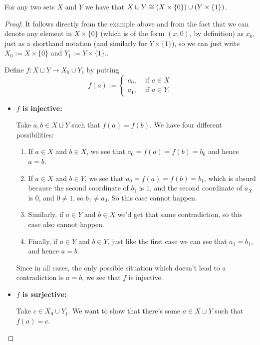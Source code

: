 \begin{lemma}\label{lem:sqcup is indexed union}
	For any two sets $X$ and $Y$ we have that $X\sqcup Y\cong (X\times\{0\})\cup (Y\times\{1\})$.
\end{lemma}
\begin{proof}
	It follows directly from the example above and from the fact that we can denote any element in $X\times\{0\}$ (which is of the form $(x,0)$, by definition) as $x_0$, just as a shorthand notation (and similarly for $Y\times\{1\}$), so we can just write $X_0:=X\times\{0\}$ and $Y_1:=Y\times\{1\}$..
	
	\bigskip
	Define $f:X\sqcup Y\to X_0\cup Y_1$ by putting
	\[f(a):=\begin{cases}
	a_0,&\mbox{ if }a\in X\\
	a_1,&\mbox{ if }a\in Y.
	\end{cases}\]
	
	\begin{itemize}
		\item \textbf{$f$ is injective:}
		
		Take $a,b\in X\sqcup Y$ such that $f(a)=f(b)$. We have four different possibilities:
		
		\begin{enumerate}
			\item If $a\in X$ and $b\in X$, we see that $a_0=f(a)=f(b)=b_0$ and hence $a=b$.
			
			\item If $a\in X$ and $b\in Y$, we see that $a_0=f(a)=f(b)=b_1$, which is absurd because the second coordinate of $b_1$ is $1$, and the second coordinate of $a_X$ is $0$, and $0\neq 1$, so $b_1\neq a_0$. So this case cannot happen.
			
			\item Similarly, if $a\in Y$ and $b\in X$ we'd get that same contradiction, so this case also cannot happen.
			
			\item Finally, if $a\in Y$ and $b\in Y$, just like the first case we can see that $a_1=b_1$, and hence $a=b$.			
		\end{enumerate}
		
		
		
		Since in all cases, the only possible situation which doesn't lead to a contradiction is $a=b$, we see that $f$ is injective.
		
		\item \textbf{$f$ is surjective:}
		
		Take $c\in X_0\cup Y_1$. We want to show that there's some $a\in X\sqcup Y$ such that $f(a)=c$.
		

\end{itemize}
\end{proof}
